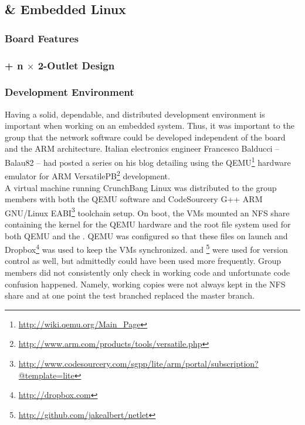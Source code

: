 \subsection{\olimex \& Embedded Linux}
\subsubsection{Board Features}

\subsubsection{\arm + n $\times$ 2-Outlet \atmega Design}

\subsubsection{Development Environment}

Having a solid, dependable, and distributed development environment is important when working on an embedded system.  Thus, it was important to the group that the network software could be developed independent of the \olimex board and the ARM architecture.  Italian electronics engineer Francesco Balducci -- Balau82 -- had posted a series on his blog detailing using the QEMU\footnote{\url{http://wiki.qemu.org/Main_Page}} hardware emulator for ARM VersatilePB\footnote{\url{http://www.arm.com/products/tools/versatile.php}} development.\\

A virtual machine running CrunchBang Linux was distributed to the group members with both the QEMU software and CodeSourcery G++ ARM GNU/Linux EABI\footnote{\url{http://www.codesourcery.com/sgpp/lite/arm/portal/subscription?@template=lite}}  toolchain setup.  On boot, the VMs mounted an NFS share containing the kernel for the QEMU hardware and the root file system used for both QEMU and the \olimex.\cite{balaunfs}  QEMU was configured so that these files on launch and Dropbox\footnote{\url{http://dropbox.com}} was used to keep the VMs synchronized.  \git and \github\footnote{\url{http://github.com/jakealbert/netlet}} were used for version control as well, but admittedly could have been used more frequently.  Group members did not consistently only check in working code and unfortunate code confusion happened.  Namely, working copies were not always kept in the NFS share and at one point the test branched replaced the master branch.\\ 


